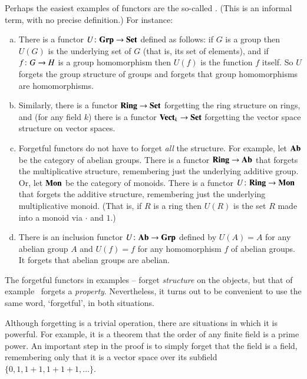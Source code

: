 \begin{examples}
\label{egs:forgetful-functors}
Perhaps the easiest examples of functors are the so-called .  (This is an informal term, with no precise definition.)  For
instance:
%
\begin{enumerate}[(b)]
\item
\label{eg:forgetful-groups}
There is a functor $U\from \Grp \to \Set$ defined as follows: if $G$ is a
group then $U(G)$ is the underlying%
%
%
set of $G$ (that is, its set of elements), and if $f\from G \to H$ is a
group homomorphism then $U(f)$ is the function $f$ itself.  So $U$ forgets
the group structure of groups and forgets that group homomorphisms are
homomorphisms.

\item
\label{eg:forgetful-ring-vs}
Similarly, there is a functor $\mathbf{Ring} \to \mathbf{Set}$ forgetting the ring
structure on rings, and (for any field $k$) there is a functor $\mathbf{Vect}_k
\to \mathbf{Set}$ forgetting the vector space structure on vector spaces.

\item
\label{eg:forgetful-part}
Forgetful functors do not have to forget \emph{all} the structure.  For
example, let $\mathbf{Ab}$%
%
%
be the category of abelian groups.  There is a functor $\mathbf{Ring} \to \mathbf{Ab}$ that
forgets the multiplicative structure, remembering just the underlying
additive group.  Or, let $\mathbf{Mon}$%
%
%
be the category of monoids.  There is a functor $U\from \Ring \to \Mon$
that forgets the additive structure, remembering just the underlying%
%
%
multiplicative monoid.  (That is, if $R$ is a ring then $U(R)$ is the set
$R$ made into a monoid via $\cdot$ and $1$.)

\item
\label{eg:forgetful-ab}
There is an inclusion functor $U\from \Ab \to \Grp$ defined by $U(A) = A$
for any abelian group $A$ and $U(f) = f$ for any homomorphism $f$ of abelian
groups.  It forgets that abelian groups are abelian.
\end{enumerate}

The forgetful functors in examples
-- forget
\emph{structure} on the objects, but that of
example~ forgets a \emph{property}.  Nevertheless,
it turns out to be convenient to use the same word, `forgetful', in both
situations.

Although forgetting is a trivial operation, there are situations in which
it is powerful.  For example, it is a theorem that the order of any finite
field is a prime power.  An important step in the proof is to simply forget
that the field is a field, remembering only that it is a vector space over
its subfield $\{0, 1, 1 + 1, 1 + 1 + 1, \ldots\}$.
\end{examples}

